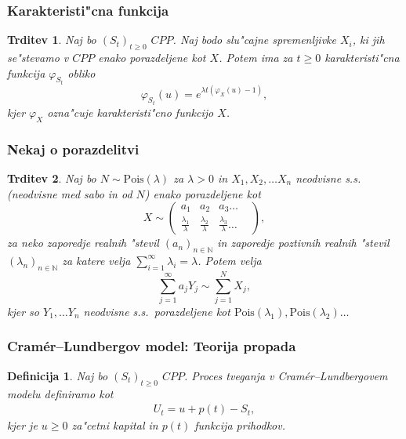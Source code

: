 \documentclass[]{beamer} %
\theoremstyle{plain}
\newtheorem{definicija}{Definicija}
\newtheorem{trditev}{Trditev}
\newcommand{\N}{\mathbb{N}}
\newcommand{\1}{\mathds{1}}
\newcommand{\Pois}[1]{\text{Pois}(#1)}
\begin{document}
\begin{frame}
  \frametitle{Karakteristi"cna funkcija}
  \begin{trditev}
    Naj bo $(S_t)_{t\geq0}$ $CPP$. Naj bodo slu"cajne spremenljivke $X_i$, ki jih se"stevamo v 
    $CPP$ enako porazdeljene kot $X$. Potem ima za $t\geq0$ karakteristi"cna funkcija $\varphi_{S_t}$ 
    obliko
    \begin{equation*}
        \varphi_{S_t}(u) = e^{\lambda t\left(\varphi_X(u) - 1\right)}, 
    \end{equation*}
    kjer $\varphi_X$ ozna"cuje karakteristi"cno funkcijo $X$.
    \label{trd:MomentGener}
    \end{trditev}
\end{frame}

\begin{frame}
    \frametitle{Nekaj o porazdelitvi}
    \begin{trditev}
        Naj bo $N\sim \Pois{\lambda}$  za $\lambda >0$ in $X_1, X_2, \dots X_n$ neodvisne s.s. (neodvisne 
        med sabo in od $N$) enako porazdeljene kot
        $$ X\sim
        \begin{pmatrix}
            a_1 & a_2 & a_3  \dots & \\
            \tfrac{\lambda_1}{\lambda} & \tfrac{\lambda_2}{\lambda} & \tfrac{\lambda_3}{\lambda} \dots & 
        \end{pmatrix},
        $$
        za neko zaporedje realnih "stevil $(a_n)_{n\in\N}$ in 
        zaporedje poztivnih realnih "stevil $(\lambda_n)_{n\in\N}$ za katere velja 
        ${\sum_{i=1}^\infty\lambda_i = \lambda}$.
        Potem velja 
        \begin{equation*}
            \sum_{j=1}^\infty a_jY_j \sim \sum_{j=1}^NX_j,
        \end{equation*}
        kjer so $Y_1, \dots Y_n$ neodvisne s.s.\ porazdeljene kot 
        $\Pois{\lambda_1}, \Pois{\lambda_2} \dots $
        \label{trd:NXjeEnakoaY}
    \end{trditev}
\end{frame}

\begin{frame}
    \frametitle{Cramér--Lundbergov model: Teorija propada}
    \begin{definicija}
        Naj bo $(S_t)_{t\geq0}$ $CPP$.
        \textit{Proces tveganja} v Cramér--Lundbergovem modelu definiramo kot
        \begin{align*}
            U_t = u + p(t) - S_t,
        \end{align*}
        kjer je $u \geq 0$ za"cetni kapital in $p(t)$ funkcija prihodkov. 
        \label{def:procesTveganja}
    \end{definicija}
\end{frame}
\end{document}

